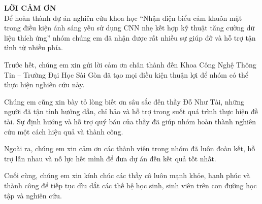 
{\LARGE \textbf{LỜI CẢM ƠN}} \\[1cm]

Để hoàn thành dự án nghiên cứu khoa học “Nhận diện biểu cảm khuôn mặt trong điều kiện ánh sáng yếu sử dụng CNN nhẹ kết hợp kỹ thuật tăng cường dữ liệu thích ứng” nhóm chúng em đã nhận được rất nhiều sự giúp đỡ và hỗ trợ tận tình từ nhiều phía.

Trước hết, chúng em xin gửi lời cảm ơn chân thành đến Khoa Công Nghệ Thông Tin – Trường Đại Học Sài Gòn đã tạo mọi điều kiện thuận lợi để nhóm có thể thực hiện nghiên cứu này.

Chúng em cũng xin bày tỏ lòng biết ơn sâu sắc đến thầy Đỗ Như Tài, những người đã tận tình hướng dẫn, chỉ bảo và hỗ trợ trong suốt quá trình thực hiện đề tài. Sự định hướng và hỗ trợ quý báu của thầy đã giúp nhóm hoàn thành nghiên cứu một cách hiệu quả và thành công.

Ngoài ra, chúng em xin cảm ơn các thành viên trong nhóm đã luôn đoàn kết, hỗ trợ lẫn nhau và nỗ lực hết mình để đưa dự án đến kết quả tốt nhất.

Cuối cùng, chúng em xin kính chúc các thầy cô luôn mạnh khỏe, hạnh phúc và thành công để tiếp tục dìu dắt các thế hệ học sinh, sinh viên trên con đường học tập và nghiên cứu.